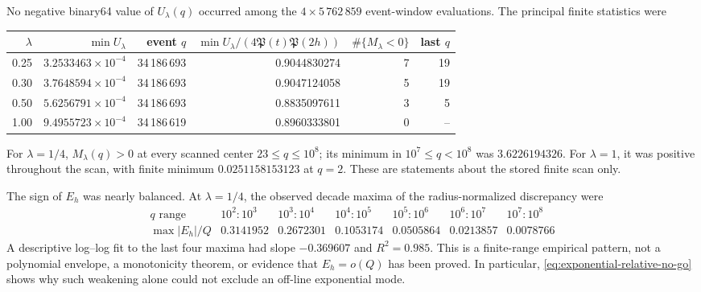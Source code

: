 \documentclass[11pt,a4paper]{article}
\numberwithin{equation}{section}
\theoremstyle{definition}
\begin{document}
No negative binary64 value of \(U_\lambda(q)\) occurred among the
\(4\times5\,762\,859\) event-window evaluations.  The principal finite
statistics were
\begin{center}
\small
\begin{tabular}{rrrrrr}
\toprule
\(\lambda\) & \(\min U_\lambda\) & event \(q\) &
\(\min U_\lambda/(4\mathfrak P(t)\mathfrak P(2h))\) &
\(\#\{M_\lambda<0\}\) & last \(q\)\\
\midrule
0.25 & \(3.2533463\times10^{-4}\) & 34\,186\,693 & 0.9044830274 & 7 & 19\\
0.30 & \(3.7648594\times10^{-4}\) & 34\,186\,693 & 0.9047124058 & 5 & 19\\
0.50 & \(5.6256791\times10^{-4}\) & 34\,186\,693 & 0.8835097611 & 3 & 5\\
1.00 & \(9.4955723\times10^{-4}\) & 34\,186\,619 & 0.8960333801 & 0 & --\\
\bottomrule
\end{tabular}
\end{center}
For \(\lambda=1/4\), \(M_\lambda(q)>0\) at every scanned center
\(23\le q\le10^8\); its minimum in \(10^7\le q<10^8\) was
\(3.6226194326\).  For \(\lambda=1\), it was positive throughout the scan,
with finite minimum \(0.0251158153123\) at \(q=2\).  These are statements
about the stored finite scan only.

The sign of \(E_h\) was nearly balanced.  At \(\lambda=1/4\), the observed
decade maxima of the radius-normalized discrepancy were
\[
\begin{array}{c|rrrrrr}
q\text{ range}&10^2\!:\!10^3&10^3\!:\!10^4&10^4\!:\!10^5&
10^5\!:\!10^6&10^6\!:\!10^7&10^7\!:\!10^8\\ \hline
\max |E_h|/Q&0.3141952&0.2672301&0.1053174&0.0505864&0.0213857&0.0078766
\end{array}
\]
A descriptive log--log fit to the last four maxima had slope
\(-0.369607\) and \(R^2=0.985\).  This is a finite-range empirical pattern,
not a polynomial envelope, a monotonicity theorem, or evidence that
\(E_h=o(Q)\) has been proved.  In particular,
\eqref{eq:exponential-relative-no-go} shows why such weakening alone could
not exclude an off-line exponential mode.
\end{document}
